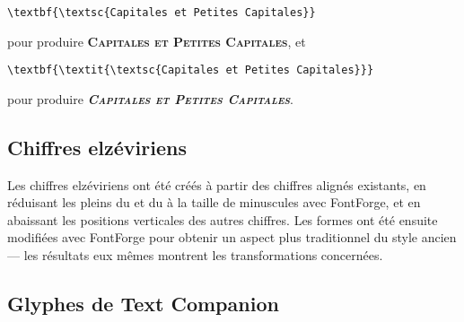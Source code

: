 \documentclass[12pt,english,french]{article}
\begin{document}
\begin{verbatim}
\textbf{\textsc{Capitales et Petites Capitales}}
\end{verbatim}
pour produire \textbf{\textsc{Capitales et Petites Capitales}}, et

\begin{verbatim}
\textbf{\textit{\textsc{Capitales et Petites Capitales}}}
\end{verbatim}
pour produire \textbf{\textit{\textsc{Capitales et Petites Capitales}}}.

\subsection{Chiffres elzéviriens}


Les chiffres elzéviriens ont été créés à partir des chiffres alignés existants, en réduisant les pleins du  et du  à la taille de minuscules avec FontForge, et en abaissant les positions verticales des autres chiffres. Les formes ont été ensuite modifiées avec FontForge pour obtenir un aspect plus traditionnel du style ancien --- les résultats eux mêmes montrent les transformations concernées.

\subsection{Glyphes de Text Companion}

\end{document}
